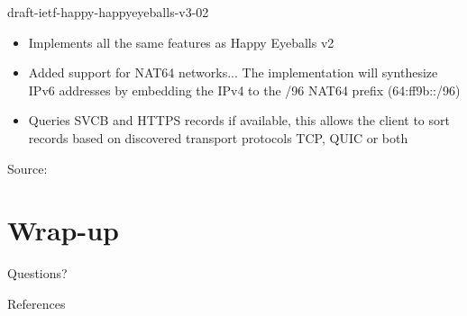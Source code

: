 \documentclass[aspectratio=169]{beamer}
\begin{document}
\begin{frame}{draft-ietf-happy-happyeyeballs-v3-02}
  \begin{itemize}
    \item Implements all the same features as Happy Eyeballs v2
    \item Added support for NAT64 networks... The implementation will synthesize IPv6 addresses by embedding the IPv4 to the /96 NAT64 prefix (64:ff9b::/96)
    \item Queries SVCB and HTTPS records if available, this allows the client to sort records based on discovered transport protocols TCP, QUIC or both
  \end{itemize}
  \centering
  {\tiny Source: \parencite{paulyHappyEyeballsVersion2025}}
\end{frame}

\section{Wrap-up}
\begin{frame}
  \centering
  \vfill
  {\LARGE Questions?}
  \vfill
\end{frame}

\begin{frame}[allowframebreaks]{References}
  \printbibliography
\end{frame}
\end{document}
